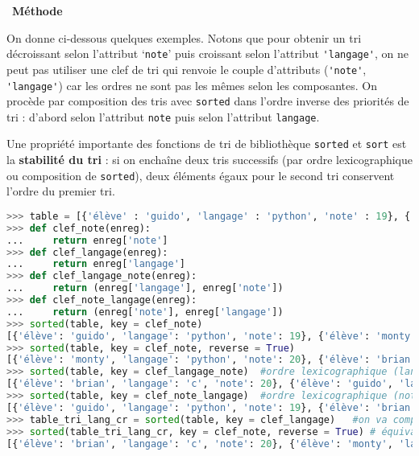 \documentclass[
  11pt,
]{article}
\newcommand{\passthrough}[1]{#1}
\newcounter{prop}
\newcounter{def}
\newenvironment{methode}[1]
{\par \medskip    \noindent  
 \begin {bclogo}[arrondi =0.1,logo=\bcoutil, marge=4,noborder = true] {~\textbf{Méthode}   {\itshape #1} }  \par}
{
\end{bclogo}
 \par \bigskip }
\begin{document}
\begin{methode}{}
On donne ci-dessous quelques exemples. Notons que pour obtenir un tri
décroissant selon l'attribut `\passthrough{\lstinline!note!}' puis
croissant selon l'attribut \passthrough{\lstinline!'langage'!}, on ne
peut pas utiliser une clef de tri qui renvoie le couple d'attributs
(\passthrough{\lstinline!'note'!}, \passthrough{\lstinline!'langage'!})
car les ordres ne sont pas les mêmes selon les composantes. On procède
par composition des tris avec \passthrough{\lstinline!sorted!} dans
l'ordre inverse des priorités de tri : d'abord selon l'attribut
\passthrough{\lstinline!note!} puis selon l'attribut
\passthrough{\lstinline!langage!}.

Une propriété importante des fonctions de tri de bibliothèque
\passthrough{\lstinline!sorted!} et \passthrough{\lstinline!sort!} est
la \textbf{stabilité du tri} : si on enchaîne deux tris successifs (par
ordre lexicographique ou composition de
\passthrough{\lstinline!sorted!}), deux éléments égaux pour le second
tri conservent l'ordre du premier tri.

\begin{lstlisting}[language=Python]
>>> table = [{'élève' : 'guido', 'langage' : 'python', 'note' : 19}, {'élève' : 'monty', 'langage' : 'python', 'note' : 20}, {'élève' : 'brian', 'langage' : 'c', 'note' : 20}]
>>> def clef_note(enreg):
...     return enreg['note']
>>> def clef_langage(enreg):
...     return enreg['langage']
>>> def clef_langage_note(enreg):
...     return (enreg['langage'], enreg['note'])
>>> def clef_note_langage(enreg):
...     return (enreg['note'], enreg['langage'])
>>> sorted(table, key = clef_note)
[{'élève': 'guido', 'langage': 'python', 'note': 19}, {'élève': 'monty', 'langage': 'python', 'note': 20}, {'élève': 'brian', 'langage': 'c', 'note': 20}]
>>> sorted(table, key = clef_note, reverse = True)
[{'élève': 'monty', 'langage': 'python', 'note': 20}, {'élève': 'brian', 'langage': 'c', 'note': 20}, {'élève': 'guido', 'langage': 'python', 'note': 19}]
>>> sorted(table, key = clef_langage_note)  #ordre lexicographique (langage croissant, note croissant)
[{'élève': 'brian', 'langage': 'c', 'note': 20}, {'élève': 'guido', 'langage': 'python', 'note': 19}, {'élève': 'monty', 'langage': 'python', 'note': 20}]
>>> sorted(table, key = clef_note_langage)  #ordre lexicographique (note croissant, langage croissant)
[{'élève': 'guido', 'langage': 'python', 'note': 19}, {'élève': 'brian', 'langage': 'c', 'note': 20}, {'élève': 'monty', 'langage': 'python', 'note': 20}]
>>> table_tri_lang_cr = sorted(table, key = clef_langage)   #on va composer les tris avec sorted
>>> sorted(table_tri_lang_cr, key = clef_note, reverse = True) # équivalent à (note décroissant, langage croissant)
[{'élève': 'brian', 'langage': 'c', 'note': 20}, {'élève': 'monty', 'langage': 'python', 'note': 20}, {'élève': 'guido', 'langage': 'python', 'note': 19}]
\end{lstlisting}

\end{methode}
\end{document}
